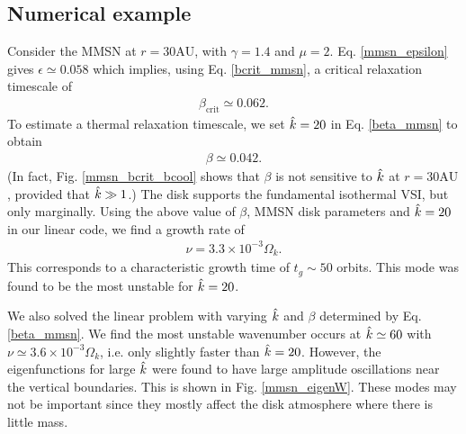 \subsection{Numerical example}
Consider  the MMSN at $r=30\mathrm{AU}$, with $\gamma=1.4$ and
$\mu=2$. Eq. \ref{mmsn_epsilon} gives $\epsilon \simeq
0.058$ which implies, using Eq. \ref{bcrit_mmsn}, a critical 
relaxation timescale of  
\begin{align*}
  \beta_\mathrm{crit} \simeq 0.062. 
\end{align*} 
To estimate a thermal relaxation timescale, we set $\hat{k}=20$ 
in Eq. \ref{beta_mmsn} to obtain 
\begin{align*}
  \beta \simeq 0.042.
\end{align*}
(In fact, Fig. \ref{mmsn_bcrit_bcool} shows that $\beta$  is not
sensitive to $\hat{k}$ at $r=30\mathrm{AU}$, provided that $\hat{k}\gg1$.)
The disk supports the fundamental isothermal VSI, but only
marginally. Using the above value of $\beta$, MMSN disk parameters and
$\hat{k}=20$ in our linear code, we find a  
growth rate of 
\begin{align*}
  \nu = 3.3\times10^{-3}\Omega_k.
\end{align*}
This corresponds to a characteristic growth time of $t_g\sim 50$
orbits. This mode was found to be the most unstable for
$\hat{k}=20$. 

We also solved the linear problem with varying $\hat{k}$  
and $\beta$ determined by Eq. \ref{beta_mmsn}. We find the most
unstable wavenumber occurs at $\hat{k}\simeq60$ with $\nu\simeq
3.6\times10^{-3}\Omega_k$, i.e. only slightly faster than $\hat{k}=20$.   
However, the eigenfunctions for large $\hat{k}$ were found to have large
amplitude oscillations near the vertical boundaries. This is shown in
Fig. \ref{mmsn_eigenW}. These modes may not be important since they
mostly affect the disk atmosphere where there is little mass. 

